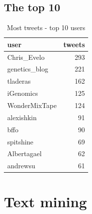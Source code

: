 \documentclass[a4paper,10pt]{article}
\begin{document}
\subsection{The top 10}
\begin{table}[ht]
\begin{center}
\begin{tabular}{lr}
  \hline
user & tweets \\ 
  \hline
Chris\_Evelo & 293 \\ 
  genetics\_blog & 221 \\ 
  tladeras & 162 \\ 
  iGenomics & 125 \\ 
  WonderMixTape & 124 \\ 
  alexishkin &  91 \\ 
  bffo &  90 \\ 
  spitshine &  69 \\ 
  Albertagael &  62 \\ 
  andrewsu &  61 \\ 
   \hline
\end{tabular}
\caption{Most tweets - top 10 users}
\end{center}
\end{table}
\newpage

\section{Text mining}
\end{document}
